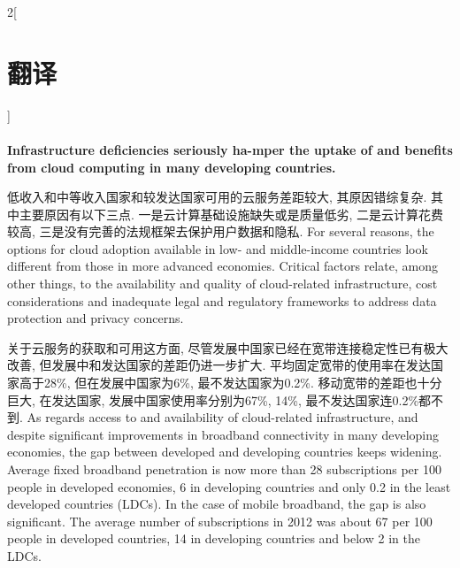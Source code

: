 \documentclass[a4paper, UTF8, 12pt]{article}
\begin{document}
\begin{paracol}{2}[\section{翻译}]
    \switchcolumn*
    \paragraph{} 
    \switchcolumn
    \paragraph{}
    {\bfseries Infrastructure deficiencies seriously ha-mper the uptake of and benefits from cloud computing in many developing countries.}

    \switchcolumn*
    低收入和中等收入国家和较发达国家可用的云服务差距较大, 其原因错综复杂. 其中主要原因有以下三点. 一是云计算基础设施缺失或是质量低劣, 二是云计算花费较高, 三是没有完善的法规框架去保护用户数据和隐私.
    \switchcolumn
    For several reasons, the options for cloud adoption available in low- and middle-income countries look different from those in more advanced economies. Critical factors relate, among other things, to the availability and quality of cloud-related infrastructure, cost considerations and inadequate legal and regulatory frameworks to address data protection and privacy concerns. 
    
    \switchcolumn*
    关于云服务的获取和可用这方面, 尽管发展中国家已经在宽带连接稳定性已有极大改善, 但发展中和发达国家的差距仍进一步扩大. 平均固定宽带的使用率在发达国家高于28\%, 但在发展中国家为6\%, 最不发达国家为0.2\%. 移动宽带的差距也十分巨大, 在发达国家, 发展中国家使用率分别为67\%, 14\%, 最不发达国家连0.2\%都不到.
    \switchcolumn
    As regards access to and availability of cloud-related infrastructure, and despite significant improvements in broadband connectivity in many developing economies, the gap between developed and developing countries keeps widening. Average fixed broadband penetration is now more than 28 subscriptions per 100 people in developed economies, 6 in developing countries and only 0.2 in the least developed countries (LDCs). In the case of mobile broadband, the gap is also significant. The average number of subscriptions in 2012 was about 67 per 100 people in developed countries, 14 in developing countries and below 2 in the LDCs. 


\end{paracol}
\end{document}
